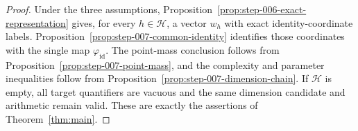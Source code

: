 \begin{proof}
Under the three assumptions, Proposition~\ref{prop:step-006-exact-representation}
gives, for every $h\in\mathcal H$, a vector $w_h$ with exact identity-coordinate
labels.  Proposition~\ref{prop:step-007-common-identity} identifies those
coordinates with the single map $\varphi_{\mathrm{id}}$.  The point-mass
conclusion follows from Proposition~\ref{prop:step-007-point-mass}, and the
complexity and parameter inequalities follow from
Proposition~\ref{prop:step-007-dimension-chain}.  If $\mathcal H$ is empty,
all target quantifiers are vacuous and the same dimension candidate and
arithmetic remain valid.  These are exactly the assertions of
Theorem~\ref{thm:main}.
\end{proof}

